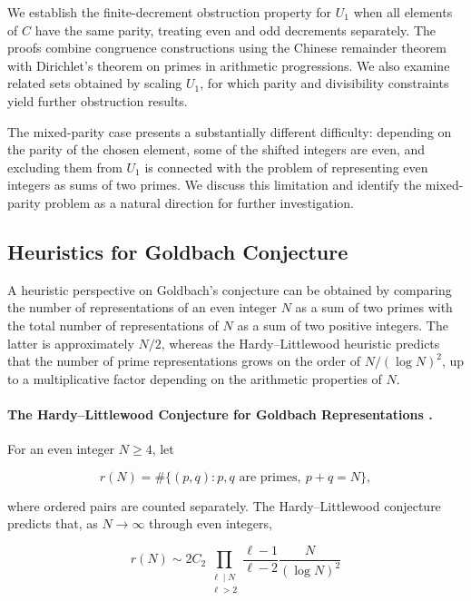 \documentclass[11pt]{article}
\begin{document}
	
	We establish the finite-decrement obstruction property for \(U_1\) when all elements of \(C\) have the same parity, treating even and odd decrements separately. The proofs combine congruence constructions using the Chinese remainder theorem with Dirichlet's theorem on primes in arithmetic progressions. We also examine related sets obtained by scaling \(U_1\), for which parity and divisibility constraints yield further obstruction results. 
	
	The mixed-parity case presents a substantially different difficulty: depending on the parity of the chosen element, some of the shifted integers are even, and excluding them from \(U_1\) is connected with the problem of representing even integers as sums of two primes. We discuss this limitation and identify the mixed-parity problem as a natural direction for further investigation.
	
	\subsection{Heuristics for Goldbach Conjecture}
	A heuristic perspective on Goldbach's conjecture can be obtained by comparing the number of representations of an even integer \(N\) as a sum of two primes with the total number of representations of \(N\) as a sum of two positive integers. The latter is approximately \(N/2\), whereas the Hardy--Littlewood heuristic predicts that the number of prime representations grows on the order of \(N/(\log N)^2\), up to a multiplicative factor depending on the arithmetic properties of \(N\).
	
	\paragraph{The Hardy--Littlewood Conjecture for Goldbach Representations \cite{HardyLittlewood1923,Vaughan1997}.}
	For an even integer \(N\geq 4\), let
	
	$$
	r(N)=\#\{(p,q): p,q\text{ are primes},\ p+q=N\},
	$$
	
	where ordered pairs are counted separately. The Hardy--Littlewood conjecture predicts that, as \(N\to\infty\) through even integers,
	
	$$
	\boxed{
		r(N)\sim
		2C_2
		\prod_{\substack{\ell\mid N\\ \ell>2}}
		\frac{\ell-1}{\ell-2}
		\frac{N}{(\log N)^2}
	}
	$$
	
\end{document}
